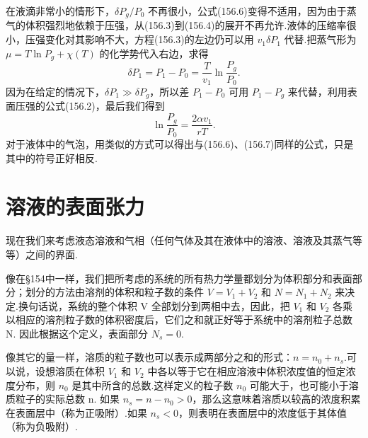 在液滴非常小的情形下，$\delta P_g/P_0$ 不再很小，公式(156.6)变得不适用，因为由于蒸气的体积强烈地依赖于压强，从(156.3)到(156.4)的展开不再允许.液体的压缩率很小，压强变化对其影响不大，方程(156.3)的左边仍可以用 $v_1\delta P_1$ 代替.把蒸气形为 $\mu=T\ln P_g+\chi(T)$ 的化学势代入右边，求得
\begin{equation*}
  \delta P_1=P_1-P_0=\frac{T}{v_1}\ln\frac{P_g}{P_0}.
\end{equation*}
因为在给定的情况下，$\delta P_1\gg\delta P_g$，所以差 $P_1-P_0$ 可用 $P_1-P_g$ 来代替，利用表面压强的公式(156.2)，最后我们得到
\begin{equation}
  \ln\frac{P_g}{P_0}=\frac{2\alpha v_1}{rT}.
\end{equation}
对于液体中的气泡，用类似的方式可以得出与(156.6)、(156.7)同样的公式，只是其中的符号正好相反.

\section{溶液的表面张力}

现在我们来考虑液态溶液和气相（任何气体及其在液体中的溶液、溶液及其蒸气等等）之间的界面.

像在§154中一样，我们把所考虑的系统的所有热力学量都划分为体积部分和表面部分；划分的方法由溶剂的体积和粒子数的条件 $V=V_1+V_2$ 和 $N=N_1+N_2$ 来决定.换句话说，系统的整个体积 V 全部划分到两相中去，因此，把 $V_1$ 和 $V_2$ 各乘以相应的溶剂粒子数的体积密度后，它们之和就正好等于系统中的溶剂粒子总数 N. 因此根据这个定义，表面部分 $N_s=0$.

像其它的量一样，溶质的粒子数也可以表示成两部分之和的形式：$n=n_0+n_s$.可以说，设想溶质在体积 $V_1$ 和 $V_2$ 中各以等于它在相应溶液中体积浓度值的恒定浓度分布，则 $n_0$ 是其中所含的总数.这样定义的粒子数 $n_0$ 可能大于，也可能小于溶质粒子的实际总数 n. 如果 $n_s=n-n_0>0$，那么这意味着溶质以较高的浓度积累在表面层中（称为正吸附）.如果 $n_s<0$，则表明在表面层中的浓度低于其体值（称为负吸附）.


